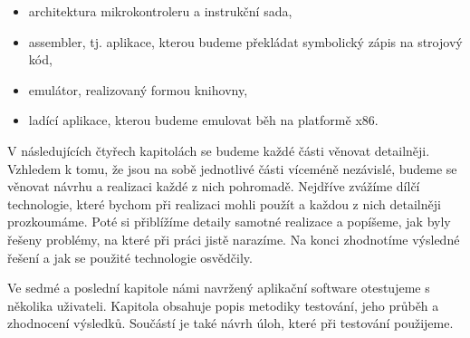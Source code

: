 \begin{introduction}
\begin{itemize}
	\item architektura mikrokontroleru a instrukční sada,
	\item assembler, tj. aplikace, kterou budeme překládat symbolický zápis na strojový kód,
	\item emulátor, realizovaný formou knihovny,
	\item ladící aplikace, kterou budeme emulovat běh na platformě x86.
\end{itemize}

V následujících čtyřech kapitolách se budeme každé části věnovat detailněji. Vzhledem k tomu, že jsou na sobě jednotlivé části víceméně nezávislé, budeme se věnovat návrhu a realizaci každé z nich pohromadě. Nejdříve zvážíme dílčí technologie, které bychom při realizaci mohli použít a každou z nich detailněji prozkoumáme. Poté si přiblížíme detaily samotné realizace a popíšeme, jak byly řešeny problémy, na které při práci jistě narazíme. Na konci zhodnotíme výsledné řešení a jak se použité technologie osvědčily.

Ve sedmé a poslední kapitole námi navržený aplikační software otestujeme s několika uživateli. Kapitola obsahuje popis metodiky testování, jeho průběh a zhodnocení výsledků. Součástí je také návrh úloh, které při testování použijeme.

\end{introduction}
